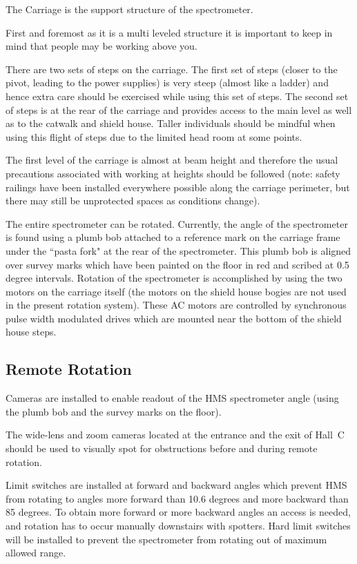 {	The Carriage is the support structure of the spectrometer.

First and foremost as it is a multi leveled structure it is important to keep in
mind that people may be working above you. 

There are two sets of steps on the carriage. The first set of steps
(closer to the pivot, leading to the power supplies) is very
steep (almost like a ladder) and hence extra care should be exercised
while using this set of steps. The second set of steps is at the rear
of the carriage and provides access to the main level as well as to
the catwalk and shield house. Taller individuals should be mindful
when using this flight of steps due to the limited head room at some 
points.

The first level of the carriage is almost at beam height and therefore
the usual precautions associated with working at heights should be followed (note:
safety railings have been installed everywhere possible along the carriage
perimeter, but there may still be unprotected spaces as conditions change).

The entire spectrometer can be rotated. Currently, the angle of the spectrometer
is found using a plumb bob attached to a reference mark on the
carriage frame under the ``pasta fork" at the rear of the spectrometer.
This plumb bob is aligned over survey marks which have been painted
on the floor in red and scribed at 0.5 degree intervals. Rotation of the spectrometer
is accomplished by using the two motors on the carriage itself (the motors on
the shield house bogies are not used in the present rotation system).
These AC motors are controlled by synchronous pulse width modulated
drives which are mounted near the bottom of the shield house steps.

\subsection{Remote Rotation}

Cameras are installed to enable readout of the HMS spectrometer angle
(using the plumb bob and the survey marks on the floor).

The wide-lens and zoom cameras located at the entrance and
the exit of Hall~C should be used to visually spot for obstructions
before and during remote rotation.

Limit switches are installed at forward
and backward angles which prevent HMS from rotating to angles more forward than
10.6 degrees and more backward than 85 degrees. To obtain more forward or more
backward angles an access is needed, and rotation has to occur manually
downstairs with spotters. Hard limit switches will be installed to prevent
the spectrometer from rotating out of maximum allowed range.

}
